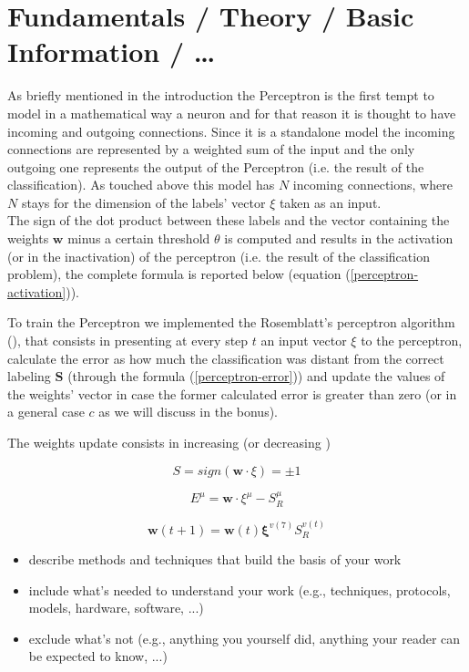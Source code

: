 \section{Fundamentals / Theory / Basic Information / \ldots}
\label{sec:fundamentals}
As briefly mentioned in the introduction the Perceptron is the first tempt to model in a mathematical way
a neuron and for that reason it is thought to have incoming and outgoing connections. Since it is a standalone
model the incoming connections are represented by a weighted sum of the input and the only outgoing one represents
the output of the Perceptron (i.e. the result of the classification). As touched above this model has $N$ incoming connections,
where $N$ stays for the dimension of the labels' vector $\xi$ taken as an input.\\
The sign of the dot product between these labels and the vector containing the weights $\mathsf{\bm{w}}$ minus a certain threshold
$\theta$ is computed and results in the activation (or in the inactivation) of the perceptron (i.e. the result of the classification problem),
the complete formula is reported below (equation (\ref{perceptron-activation})).

To train the Perceptron we implemented the Rosemblatt's perceptron algorithm (\cite{rosenblatt1958perceptron}), that consists in
presenting at every step $t$ an input vector $\xi$ to the perceptron, calculate the error as how much the classification was distant from
the correct labeling $\bm{S}$ (through the formula (\ref{perceptron-error})) and update the values of the weights' vector in case the former
calculated error is greater than zero (or in a general case $c$ as we will discuss in the bonus).

The weights update consists in increasing (or decreasing )


\begin{equation} \label{perceptron-activation}
    S = sign(\mathsf{\bm{w}} \cdotp \xi) = \pm 1
\end{equation}

\begin{equation} \label{perceptron-error}
    E^\mu = \mathsf{\bm{w}} \cdotp \xi^\mu - S^\mu_R
\end{equation}

\begin{equation} \label{perceptron-weight-update}
    \mathsf{\bm{w}}(t+1) = \mathsf{\bm{w}}(t) \bm{\xi}^{v(7)} S^{v(t)}_R
\end{equation}

\begin{itemize}
\item describe methods and techniques that build the basis of your work
\item include what's needed to understand your work (e.g., techniques, protocols, models, hardware, software, ...)
\item exclude what's not (e.g., anything you yourself did, anything your reader can be expected to know, ...)
\end{itemize}
